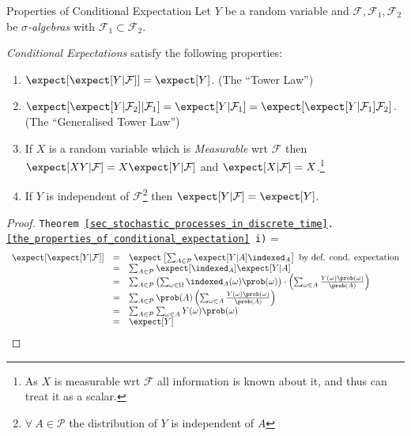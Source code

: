 \documentclass[11pt,a4paper]{article}
\begin{document}
  \begin{theorem}{Properties of Conditional Expectation}\label{the_properties_of_conditional_expectation}
    Let $Y$ be a random variable and $\mathcal{F},\mathcal{F}_1,\mathcal{F}_2$ be \textit{$\sigma$-algebras} with $\mathcal{F}_1\subset\mathcal{F}_2$.
    \par\textit{Conditional Expectations} satisfy the following properties:
    \begin{enumerate}
      \item $\expect[\expect[Y|\mathcal{F}]]=\expect[Y]$. (The ``Tower Law'')
      \item $\expect[\expect[Y|\mathcal{F}_2]|\mathcal{F}_1]=\expect[Y|\mathcal{F}_1]=\expect[\expect[Y|\mathcal{F}_1]\mathcal{F}_2]$. (The ``Generalised Tower Law'')
      \item If $X$ is a random variable which is \textit{Measurable} wrt $\mathcal{F}$ then $\expect[XY|\mathcal{F}]=X\expect[Y|\mathcal{F}]$ and $\expect[X|\mathcal{F}]=X$.\footnote{As $X$ is measurable wrt $\mathcal{F}$ all information is known about it, and thus can treat it as a scalar.}
      \item If $Y$ is independent of $\mathcal{F}$\footnote{$\forall\ A\in\mathcal{P}$ the distribution of $Y$ is independent of $A$} then $\expect[Y|\mathcal{F}]=\expect[Y]$.
    \end{enumerate}
  \end{theorem}

  \begin{proof}{\texttt{Theorem \ref{sec_stochastic_processes_in_discrete_time}.\ref{the_properties_of_conditional_expectation} i)}}
    \everymath={\displaystyle}
    \[\begin{array}{rcl}
      \expect[\expect[Y|\mathcal{F}]]&=&\expect\left[\sum_{A\in\mathcal{P}}\expect[Y|A]\indexed_A\right]\text{ by def. cond. expectation}\\
      &=&\sum_{A\in\mathcal{P}}\expect[\indexed_A]\expect[Y|A]\\
      &=&\sum_{A\in\mathcal{P}}\left(\sum_{\omega\in\Omega}\indexed_A(\omega)\prob(\omega )\right)\cdot\left(\sum_{\omega\in A}\frac{Y(\omega)\prob(\omega)}{\prob(A)}\right)\\
      &=&\sum_{A\in\mathcal{P}}\prob(A)\left(\sum_{\omega\in A}\frac{Y(\omega)\prob(\omega)}{\prob(A)}\right)\\
      &=&\sum_{A\in\mathcal{P}}\sum_{\omega\in A}Y(\omega)\prob(\omega)\\
      &=&\expect[Y]
    \end{array}\]
    \proved
  \end{proof}
\end{document}

